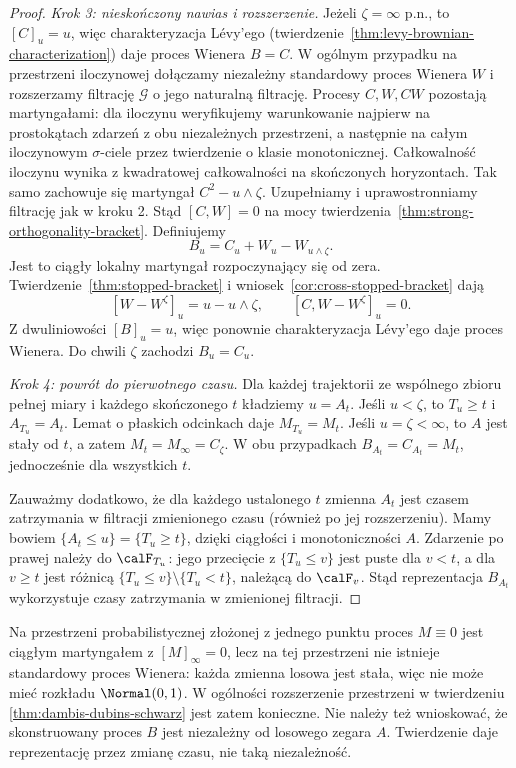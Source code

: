 \begin{proof}
\emph{Krok 3: nieskończony nawias i rozszerzenie.}
Jeżeli $\zeta=\infty$ p.n., to $[C]_u=u$,
więc charakteryzacja Lévy'ego
(twierdzenie~\ref{thm:levy-brownian-characterization})
daje proces Wienera $B=C$.
W ogólnym przypadku na przestrzeni iloczynowej
dołączamy niezależny standardowy proces Wienera $W$
i rozszerzamy filtrację $\mathcal G$ o jego
naturalną filtrację. Procesy $C,W,CW$ pozostają
martyngałami: dla iloczynu weryfikujemy
warunkowanie najpierw na prostokątach zdarzeń
z obu niezależnych przestrzeni, a następnie
na całym iloczynowym $\sigma$-ciele przez
twierdzenie o klasie monotonicznej.
Całkowalność iloczynu wynika z kwadratowej
całkowalności na skończonych horyzontach.
Tak samo zachowuje się martyngał
$C^2-u\wedge\zeta$. Uzupełniamy i
uprawostronniamy filtrację jak w kroku 2.
Stąd $[C,W]=0$ na mocy
twierdzenia~\ref{thm:strong-orthogonality-bracket}.
Definiujemy
\[
B_u=C_u+W_u-W_{u\wedge\zeta}.
\]
Jest to ciągły lokalny martyngał rozpoczynający
się od zera. Twierdzenie~\ref{thm:stopped-bracket}
i wniosek~\ref{cor:cross-stopped-bracket} dają
\[
[W-W^\zeta]_u=u-u\wedge\zeta,\qquad
[C,W-W^\zeta]_u=0.
\]
Z dwuliniowości $[B]_u=u$, więc ponownie
charakteryzacja Lévy'ego daje proces Wienera.
Do chwili $\zeta$ zachodzi $B_u=C_u$.

\emph{Krok 4: powrót do pierwotnego czasu.}
Dla każdej trajektorii ze wspólnego zbioru
pełnej miary i każdego skończonego $t$ kładziemy
$u=A_t$. Jeśli $u<\zeta$, to $T_u\ge t$
i $A_{T_u}=A_t$. Lemat o płaskich odcinkach
daje $M_{T_u}=M_t$. Jeśli $u=\zeta<\infty$,
to $A$ jest stały od $t$, a zatem
$M_t=M_\infty=C_\zeta$.
W obu przypadkach $B_{A_t}=C_{A_t}=M_t$,
jednocześnie dla wszystkich $t$.

Zauważmy dodatkowo, że dla każdego ustalonego $t$
zmienna $A_t$ jest czasem zatrzymania w filtracji
zmienionego czasu (również po jej rozszerzeniu).
Mamy bowiem $\{A_t\le u\}=\{T_u\ge t\}$,
dzięki ciągłości i monotoniczności $A$.
Zdarzenie po prawej należy do $\calF_{T_u}$:
jego przecięcie z $\{T_u\le v\}$ jest puste
dla $v<t$, a dla $v\ge t$ jest różnicą
$\{T_u\le v\}\setminus\{T_u<t\}$,
należącą do $\calF_v$.
Stąd reprezentacja $B_{A_t}$ wykorzystuje
czasy zatrzymania w zmienionej filtracji.
\end{proof}

\begin{uwaga}
Na przestrzeni probabilistycznej złożonej z jednego
punktu proces $M\equiv0$ jest ciągłym martyngałem
z $[M]_\infty=0$, lecz na tej przestrzeni
nie istnieje standardowy proces Wienera:
każda zmienna losowa jest stała, więc nie może
mieć rozkładu $\Normal(0,1)$.
W ogólności rozszerzenie przestrzeni w twierdzeniu
\ref{thm:dambis-dubins-schwarz} jest zatem konieczne.
Nie należy też wnioskować, że skonstruowany
proces $B$ jest niezależny od losowego zegara $A$.
Twierdzenie daje reprezentację przez zmianę czasu,
nie taką niezależność.
\end{uwaga}

